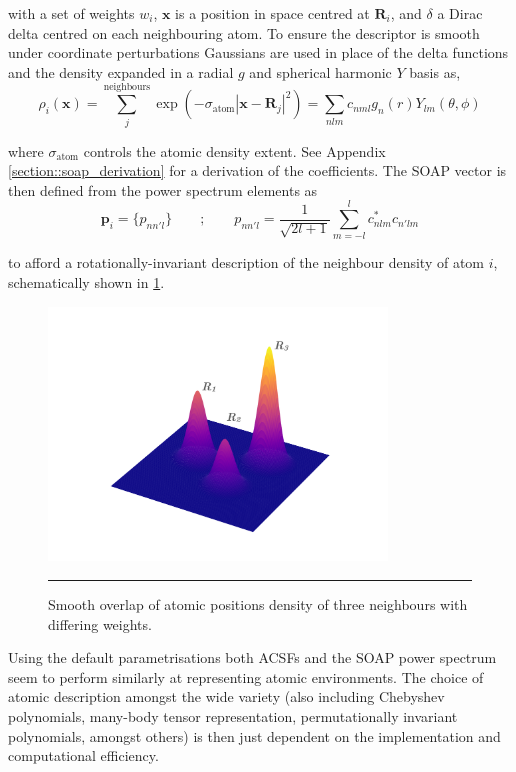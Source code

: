\documentclass[main.tex]{subfiles}
\begin{document}
with a set of weights $w_i$, $\boldsymbol{x}$ is a position in space centred at $\boldsymbol{R}_i$, and $\delta$ a Dirac delta centred on each neighbouring atom. To ensure the descriptor is smooth under coordinate perturbations Gaussians are used in place of the delta functions and the density expanded in a radial $g$ and spherical harmonic $Y$ basis as,
\begin{equation}
	\rho_i(\boldsymbol{x}) = \sum_j^\text{neighbours}  \exp(-\sigma_\text{atom} |\boldsymbol{x} - \boldsymbol{R}_j|^2)  = \sum_{nlm} c_{nml} g_n(r) Y_{lm}(\theta, \phi)
\end{equation}

where $\sigma_\text{atom}$ controls the atomic density extent. See Appendix \ref{section::soap_derivation} for a derivation of the coefficients. The SOAP vector is then defined from the power spectrum elements as
\begin{equation}
	\boldsymbol{p}_i = \{p_{n n' l}\} \qquad ; \qquad p_{n n' l} = \frac{1}{\sqrt{2l + 1}} \sum_{m=-l}^l c_{nlm}^* c_{n'lm}
\end{equation}

to afford a rotationally-invariant description of the neighbour density of atom $i$, schematically shown in \figurename{ \ref{fig::theory_soap}}.

\begin{figure}[h!]
	\centering
	\includegraphics[width=9cm]{2/figs/fig3/SOAP.pdf}
	\vspace{0.5cm}
	\hrule
	\caption{Smooth overlap of atomic positions density of three neighbours with differing weights.}
	\label{fig::theory_soap}
\end{figure}


 Using the default parametrisations both ACSFs and the SOAP power spectrum seem to perform similarly at representing atomic environments.\cite{Pozdnyakov2020, Onat2020} The choice of atomic description amongst the wide variety (also including Chebyshev polynomials\cite{Thompson2015}, many-body tensor representation\cite{Huo2018unified}, permutationally invariant polynomials\cite{Braams2009, Oord2020}, amongst others) is then just dependent on the implementation and computational efficiency.
\end{document}
